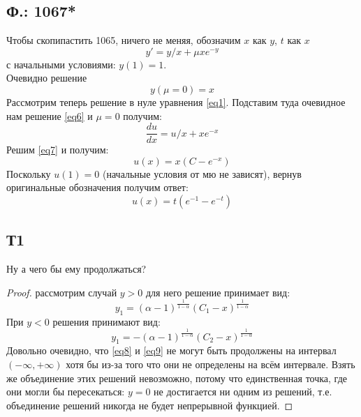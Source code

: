 \documentclass{article}
\begin{document}
\subsection{Ф.: 1067*}
Чтобы скопипастить 1065, ничего не меняя, обозначим $x$ как $y$, $t$  как $x$ 
\begin{equation}
    y'=y/x+\mu x e^{-y}
\end{equation}
с начальными условиями: $y(1)=1$. \\
Очевидно решение 
\begin{equation} \label{eq6}
    y(\mu=0)=x
\end{equation} 
Рассмотрим теперь решение в нуле уравнения \ref{eq1}. Подставим туда очевидное нам решение \ref{eq6} и $\mu=0$ получим:
\begin{equation} \label{eq7}
    \frac{d u}{d x} = u/x + x e^{-x}
\end{equation}
Решим \ref{eq7} и получим:
\begin{equation}
    u(x)= x(C - e^{-x})
\end{equation}
Поскольку $u(1)=0$ (начальные условия от мю не зависят), вернув оригинальные обозначения получим ответ:\\
\begin{equation}
    u(x)= t(e^{-1} - e^{-t})
\end{equation}
\subsection{Т1}
Ну а чего бы ему продолжаться?
\begin{proof}
рассмотрим случай $y>0$ для него решение принимает вид:
\begin{equation}\label{eq8}
    y_1=(\alpha -1)^{\frac{1}{1-\alpha}}(C_1-x)^{\frac{1}{1-\alpha}}
\end{equation}
При $y<0$ решения принимают вид:
\begin{equation}\label{eq9}
    y_1=-(\alpha -1)^{\frac{1}{1-\alpha}}(C_2-x)^{\frac{1}{1-\alpha}}
\end{equation}
 Довольно очевидно, что \ref{eq8} и \ref{eq9} не могут быть продолжены на интервал $(-\infty, + \infty)$ хотя бы из-за того что они не определены на всём интервале. Взять же объединение этих решений невозможно, потому что единственная точка, где они могли бы пересекаться: $y=0$ не достигается ни одним из решений, т.е. объединение решений никогда не будет непрерывной функцией.
\end{proof}
\end{document}
